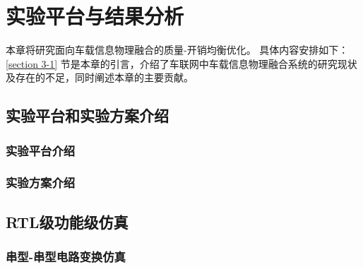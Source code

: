 \chapter[\hspace{0pt}实验与验证]{{\hspace{-5pt}实验平台与结果分析}}
\removelofgap
\removelotgap
本章将研究面向车载信息物理融合的质量-开销均衡优化。
具体内容安排如下：
\ref{section 3-1} 节是本章的引言，介绍了车联网中车载信息物理融合系统的研究现状及存在的不足，同时阐述本章的主要贡献。
\section[\hspace{-2pt}实验平台和实验方案介绍]{{ \hspace{-8pt}实验平台和实验方案介绍}}\label{section 5-1}
\subsection[\hspace{-2pt}实验平台介绍]{{ \hspace{-8pt}实验平台介绍}}

\subsection[\hspace{-2pt}实验方案介绍]{{ \hspace{-8pt}实验方案介绍}}

\section[\hspace{-2pt}RTL级功能级仿真]{{ \hspace{-8pt}RTL级功能级仿真}}\label{section 5-2}
\subsection[\hspace{-2pt}串行-串行电路变换仿真]{{ \hspace{-8pt}串型-串型电路变换仿真}}
